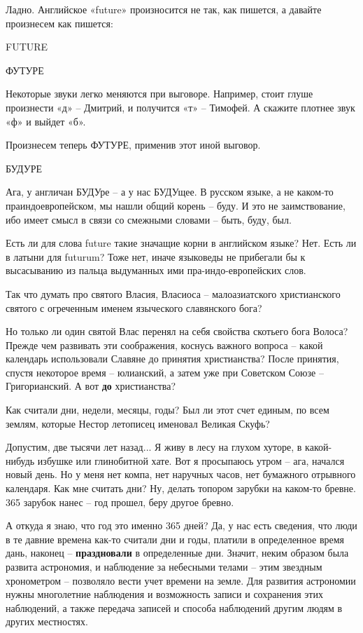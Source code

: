 \documentclass[a5paper,11pt,openany]{article}
\begin{document}
    Ладно. Английское «future» произносится не так, как пишется, а давайте произнесем как пишется:\newline

FUTURE\newline

ФУТУРЕ\newline

  Некоторые звуки легко меняются при выговоре. Например, стоит глуше произнести «д» – Дмитрий, и получится «т» – Тимофей. А скажите плотнее звук «ф» и выйдет «б».

 Произнесем теперь ФУТУРЕ, применив этот иной выговор.\newline

БУДУРЕ\newline

 Ага, у англичан БУДУре – а у нас БУДУщее. В русском языке, а не каком-то праиндоевропейском, мы нашли общий корень – буду. И это не заимствование, ибо имеет смысл в связи со смежными словами – быть, буду, был.

Есть ли для слова future такие значащие корни в английском языке? Нет. Есть ли в латыни для futurum? Тоже нет, иначе языковеды не прибегали бы к высасыванию из пальца выдуманных ими пра-индо-европейских слов.

 Так что думать про святого Власия, Власиоса – малоазиатского христианского святого с огреченным именем языческого славянского бога?

    Но только ли один святой Влас перенял на себя свойства скотьего бога Волоса? Прежде чем развивать эти соображения, коснусь важного вопроса – какой календарь использовали Славяне до принятия христианства? После принятия, спустя некоторое время – юлианский, а затем уже при Советском Союзе – Григорианский. А вот \textbf{до} христианства? 

  Как считали дни, недели, месяцы, годы? Был ли этот счет единым, по всем землям, которые Нестор летописец именовал Великая Скуфь? 

 Допустим, две тысячи лет назад... Я живу в лесу на глухом хуторе, в какой-нибудь избушке или глинобитной хате. Вот я просыпаюсь утром – ага, начался новый день. Но у меня нет компа, нет наручных часов, нет бумажного отрывного календаря. Как мне считать дни? Ну, делать топором зарубки на каком-то бревне. 365 зарубок нанес – год прошел, беру другое бревно.

   А откуда я знаю, что год это именно 365 дней? Да, у нас есть сведения, что люди в те давние времена как-то считали дни и годы, платили в определенное время дань, наконец – \textbf{праздновали} в определенные дни. Значит, неким образом была развита астрономия, и наблюдение за небесными телами – этим звездным хронометром – позволяло вести учет времени на земле. Для развития астрономии нужны многолетние наблюдения и возможность записи и сохранения этих наблюдений, а также передача записей и способа наблюдений другим людям в других местностях.
\end{document}
